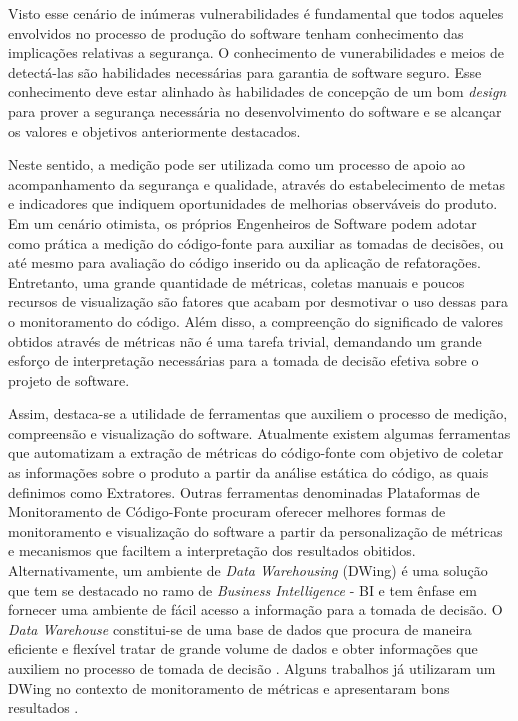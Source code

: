 Visto esse cenário de inúmeras vulnerabilidades é fundamental que todos aqueles envolvidos no processo de produção do software tenham conhecimento das implicações relativas a segurança.
%
O conhecimento de vunerabilidades e meios de detectá-las são habilidades necessárias para garantia de software seguro.
%
Esse conhecimento deve estar alinhado às habilidades de concepção de um bom \emph{design} para prover a segurança necessária no desenvolvimento do software e se alcançar os valores e objetivos anteriormente destacados.


Neste sentido, a medição pode ser utilizada como um processo de apoio ao acompanhamento da segurança e qualidade, através do estabelecimento de metas e indicadores que indiquem oportunidades de melhorias observáveis do produto.
%
Em um cenário otimista, os próprios Engenheiros de Software podem adotar como prática a medição do código-fonte para auxiliar as tomadas de decisões, ou até mesmo para avaliação do código inserido ou da aplicação de refatorações.
%
Entretanto, uma grande quantidade de métricas, coletas manuais e poucos recursos de visualização são fatores que acabam por desmotivar o uso dessas para o monitoramento do código.
%
Além disso, a compreenção do significado de valores obtidos através de métricas não é uma tarefa trivial, demandando um grande esforço de interpretação necessárias para a tomada de decisão efetiva sobre o projeto de software.


Assim, destaca-se a utilidade de ferramentas que auxiliem o processo de medição, compreensão e visualização do software.
%
Atualmente existem algumas ferramentas que automatizam a extração de métricas do código-fonte com objetivo de coletar as informações sobre o produto a partir da análise estática do código, as quais definimos como Extratores.
%
Outras ferramentas denominadas Plataformas de Monitoramento de Código-Fonte procuram oferecer melhores formas de monitoramento e visualização do software a partir da personalização de métricas e mecanismos que faciltem a interpretação dos resultados obitidos.
%
Alternativamente, um ambiente de \emph{Data Warehousing} (DWing) é uma solução que tem se destacado no ramo de \emph{Business Intelligence} - BI e tem ênfase em fornecer uma ambiente de fácil acesso a informação para a tomada de decisão. O \emph{Data Warehouse} constitui-se de uma base de dados que procura de maneira eficiente e flexível tratar de grande volume de dados e obter informações que auxiliem no processo de tomada de decisão \cite{lopes2007}. Alguns trabalhos já utilizaram um  DWing no contexto de monitoramento de métricas e apresentaram bons resultados  \cite{Castellanos2005} \cite{Folleco2007} \cite{Silveira2010}\cite{mazuco2011} \cite{rego2014}.


